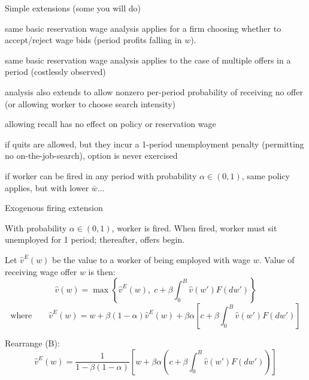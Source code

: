 \documentclass[aspectratio=169,xcolor=dvipsnames]{beamer}
\let\tempone\itemize
\let\temptwo\enditemize
\renewenvironment{itemize}{\tempone\addtolength{\itemsep}{\fill}}{\temptwo}
\begin{document}
\begin{frame}{Simple extensions (some you will do)}
\label{slide:McCall_20}
\small
\begin{itemize}
    \item same basic reservation wage analysis applies for a firm choosing whether to accept/reject wage bids (period profits falling in $w$).
    \item same basic reservation wage analysis applies to the case of multiple offers in a period (costlessly observed)
    \item analysis also extends to allow nonzero per-period probability of receiving no offer (or allowing worker to choose search intensity)
    \item allowing recall has no effect on policy or reservation wage
    \item if quits are allowed, but they incur a 1-period unemployment penalty (permitting no on-the-job-search), option is never exercised
    \item if worker can be fired in any period with probability $\alpha\in(0,1)$, same policy applies, but with lower $\bar w$...
\end{itemize}
\end{frame}

\begin{frame}{Exogenous firing extension}
\label{slide:McCall_21}
\small
\begin{itemize}
    \item With probability $\alpha\in(0,1)$, worker is fired. When fired, worker must sit unemployed for 1 period; thereafter, offers begin.
    \item Let $\hat v^{E}(w)$ be the value to a worker of being employed with wage $w$.
    Value of receiving wage offer $w$ is then:
\end{itemize}
\[
\hat v(w)=\max\left\{\hat v^{E}(w),\;c+\beta\int_0^B \hat v(w')F(dw')\right\} \tag{A}
\]
\[
\text{where}\qquad
\hat v^{E}(w)=w+\beta(1-\alpha)\hat v^{E}(w)+\beta\alpha\left[c+\beta\int_0^B \hat v(w')F(dw')\right] \tag{B}
\]
\begin{itemize}
    \item Rearrange (B):
\end{itemize}
\[
\hat v^{E}(w)=\frac{1}{1-\beta(1-\alpha)}\left[w+\beta\alpha\left(c+\beta\int_0^B \hat v(w')F(dw')\right)\right] \tag{C}
\]
\end{frame}
\end{document}
